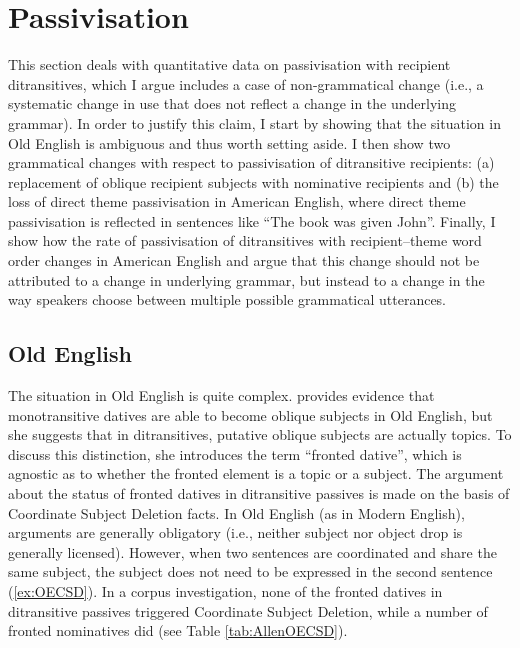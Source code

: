 	\section{Passivisation}\label{sec:en-pas}

	This section deals with quantitative data on passivisation with recipient ditransitives, which I argue includes a case of non-grammatical change (i.e., a systematic change in use that does not reflect a change in the underlying grammar). In order to justify this claim, I start by showing that the situation in Old English is ambiguous and thus worth setting aside. I then show two grammatical changes with respect to passivisation of ditransitive recipients: (a) replacement of oblique recipient subjects with nominative recipients and (b) the loss of direct theme passivisation in American English, where direct theme passivisation is reflected in sentences like ``The book was given John''. Finally, I show how the rate of passivisation of ditransitives with recipient--theme word order changes in American English and argue that this change should not be attributed to a change in underlying grammar, but instead to a change in the way speakers choose between multiple possible grammatical utterances. 

\subsection{Old English}
	The situation in Old English is quite complex. \cite{Allen.1999} provides evidence that monotransitive datives are able to become oblique subjects in Old English, but she suggests that in ditransitives, putative oblique subjects are actually topics. To discuss this distinction, she introduces the term ``fronted dative'', which is agnostic as to whether the fronted element is a topic or a subject. The argument about the status of fronted datives in ditransitive passives is made on the basis of Coordinate Subject Deletion facts. In Old English (as in Modern English), arguments are generally obligatory (i.e., neither subject nor object drop is generally licensed). However, when two sentences are coordinated and share the same subject, the subject does not need to be expressed in the second sentence (\ref{ex:OECSD}). In a corpus investigation, none of the fronted datives in ditransitive passives triggered Coordinate Subject Deletion, while a number of fronted nominatives did (see Table \ref{tab:AllenOECSD}). 

